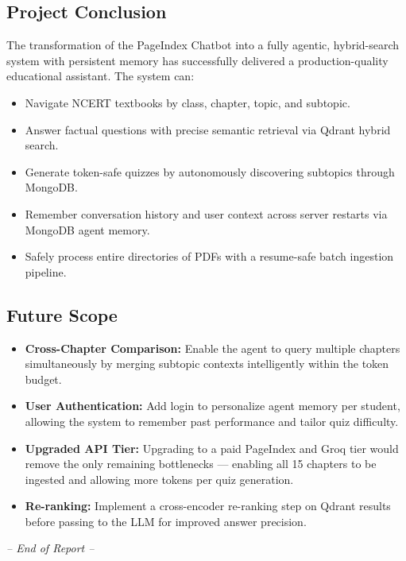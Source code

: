 \documentclass[12pt, a4paper]{article}
\begin{document}
\subsection{Project Conclusion}
The transformation of the PageIndex Chatbot into a fully agentic, hybrid-search system with persistent memory has successfully delivered a production-quality educational assistant. The system can:
\begin{itemize}
    \item Navigate NCERT textbooks by class, chapter, topic, and subtopic.
    \item Answer factual questions with precise semantic retrieval via Qdrant hybrid search.
    \item Generate token-safe quizzes by autonomously discovering subtopics through MongoDB.
    \item Remember conversation history and user context across server restarts via MongoDB agent memory.
    \item Safely process entire directories of PDFs with a resume-safe batch ingestion pipeline.
\end{itemize}

\subsection{Future Scope}
\begin{itemize}
    \item \textbf{Cross-Chapter Comparison:} Enable the agent to query multiple chapters simultaneously by merging subtopic contexts intelligently within the token budget.
    \item \textbf{User Authentication:} Add login to personalize agent memory per student, allowing the system to remember past performance and tailor quiz difficulty.
    \item \textbf{Upgraded API Tier:} Upgrading to a paid PageIndex and Groq tier would remove the only remaining bottlenecks — enabling all 15 chapters to be ingested and allowing more tokens per quiz generation.
    \item \textbf{Re-ranking:} Implement a cross-encoder re-ranking step on Qdrant results before passing to the LLM for improved answer precision.
\end{itemize}

\vspace{2cm}
\begin{center}
\textit{-- End of Report --}
\end{center}
\end{document}
